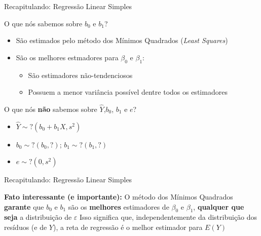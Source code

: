 \documentclass{beamer}\usepackage[]{graphicx}\usepackage[]{color}
\begin{document}
\begin{frame}{Recapitulando: Regressão Linear Simples}

O que nós sabemos sobre $b_0$ e $b_1$? \pause
\vfill
\begin{itemize}
  \item São estimados pelo método dos Mínimos Quadrados (\emph{Least Squares}) \pause
  \item São os melhores estmadores para $\beta _0$ e $\beta_1$: \pause
  \begin{itemize}
    \item São estimadores não-tendenciosos \pause
    \item Possuem a menor variância possível dentre todos os estimadores \pause  
    \end{itemize}
\end{itemize}  
\vfill
O que nós \alert{\textbf{não}} sabemos sobre $\hat Y$,$b_0$, $b_1$ e $e$? \pause
\vfill
\begin{itemize}
  \item $\hat Y \sim ?(b_0 + b_1X,s^2)$ \pause
  \item $b_0 \sim ?(b_0,?)$; $b_1 \sim ?(b_1,?)$ \pause
  \item $e \sim ?(0,s^2)$
\end{itemize}  
\vfill

\end{frame}


\begin{frame}{Recapitulando: Regressão Linear Simples}

\textbf{Fato interessante (e importante):}
\vfill
O método dos Mínimos Quadrados \textbf{garante} que $b_0$ e $b_1$ são os \textbf{melhores} estimadores de $\beta _0$ e $\beta _1$, \textbf{qualquer que seja} a distribuição de $\varepsilon$ \pause
\vfill
Isso significa que, independentemente da distribuição dos resíduos (e de $Y$), a reta de regressão é o melhor estimador para $E(Y)$
\end{frame}
\end{document}
